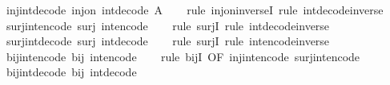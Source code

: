 \begin{isabellebody}
%
\isadelimproof
\isanewline
%
\endisadelimproof
\isanewline
{}\isamarkupfalse%
\ inj{\isacharunderscore}int{\isacharunderscore}decode{\isacharcolon}\ {\isachardoublequoteopen}inj{\isacharunderscore}on\ int{\isacharunderscore}decode\ A{\isachardoublequoteclose}\isanewline
%
\isadelimproof
\ \ %
\endisadelimproof
%
\isatagproof
{}\isamarkupfalse%
\ {\isacharparenleft}rule\ inj{\isacharunderscore}on{\isacharunderscore}inverseI{\isacharparenright}\ {\isacharparenleft}rule\ int{\isacharunderscore}decode{\isacharunderscore}inverse{\isacharparenright}%
\endisatagproof
{\isafoldproof}%
%
\isadelimproof
\isanewline
%
\endisadelimproof
\isanewline
{}\isamarkupfalse%
\ surj{\isacharunderscore}int{\isacharunderscore}encode{\isacharcolon}\ {\isachardoublequoteopen}surj\ int{\isacharunderscore}encode{\isachardoublequoteclose}\isanewline
%
\isadelimproof
\ \ %
\endisadelimproof
%
\isatagproof
{}\isamarkupfalse%
\ {\isacharparenleft}rule\ surjI{\isacharparenright}\ {\isacharparenleft}rule\ int{\isacharunderscore}decode{\isacharunderscore}inverse{\isacharparenright}%
\endisatagproof
{\isafoldproof}%
%
\isadelimproof
\isanewline
%
\endisadelimproof
\isanewline
{}\isamarkupfalse%
\ surj{\isacharunderscore}int{\isacharunderscore}decode{\isacharcolon}\ {\isachardoublequoteopen}surj\ int{\isacharunderscore}decode{\isachardoublequoteclose}\isanewline
%
\isadelimproof
\ \ %
\endisadelimproof
%
\isatagproof
{}\isamarkupfalse%
\ {\isacharparenleft}rule\ surjI{\isacharparenright}\ {\isacharparenleft}rule\ int{\isacharunderscore}encode{\isacharunderscore}inverse{\isacharparenright}%
\endisatagproof
{\isafoldproof}%
%
\isadelimproof
\isanewline
%
\endisadelimproof
\isanewline
{}\isamarkupfalse%
\ bij{\isacharunderscore}int{\isacharunderscore}encode{\isacharcolon}\ {\isachardoublequoteopen}bij\ int{\isacharunderscore}encode{\isachardoublequoteclose}\isanewline
%
\isadelimproof
\ \ %
\endisadelimproof
%
\isatagproof
{}\isamarkupfalse%
\ {\isacharparenleft}rule\ bijI\ {\isacharbrackleft}OF\ inj{\isacharunderscore}int{\isacharunderscore}encode\ surj{\isacharunderscore}int{\isacharunderscore}encode{\isacharbrackright}{\isacharparenright}%
\endisatagproof
{\isafoldproof}%
%
\isadelimproof
\isanewline
%
\endisadelimproof
\isanewline
{}\isamarkupfalse%
\ bij{\isacharunderscore}int{\isacharunderscore}decode{\isacharcolon}\ {\isachardoublequoteopen}bij\ int{\isacharunderscore}decode{\isachardoublequoteclose}\isanewline
%
\isadelimproof
\ \ %
\endisadelimproof
%

\end{isabellebody}
